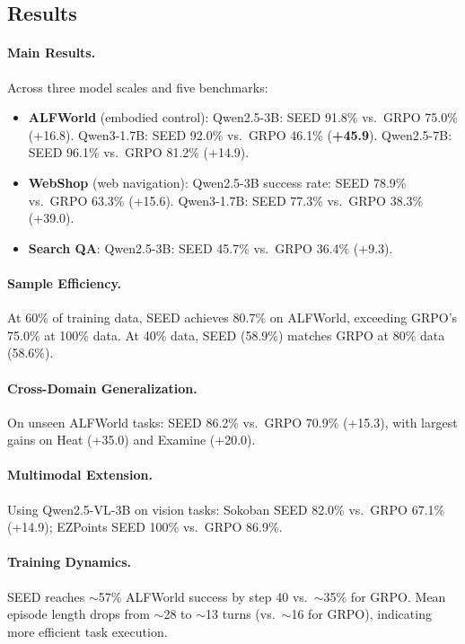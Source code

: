 \documentclass[11pt,a4paper]{article}
\begin{document}
\subsection{Results}

\paragraph{Main Results.} Across three model scales and five benchmarks:
\begin{itemize}
\item \textbf{ALFWorld} (embodied control): Qwen2.5-3B: SEED 91.8\% vs.\ GRPO 75.0\% (+16.8). Qwen3-1.7B: SEED 92.0\% vs.\ GRPO 46.1\% (\textbf{+45.9}). Qwen2.5-7B: SEED 96.1\% vs.\ GRPO 81.2\% (+14.9).
\item \textbf{WebShop} (web navigation): Qwen2.5-3B success rate: SEED 78.9\% vs.\ GRPO 63.3\% (+15.6). Qwen3-1.7B: SEED 77.3\% vs.\ GRPO 38.3\% (+39.0).
\item \textbf{Search QA}: Qwen2.5-3B: SEED 45.7\% vs.\ GRPO 36.4\% (+9.3).
\end{itemize}

\paragraph{Sample Efficiency.} At 60\% of training data, SEED achieves 80.7\% on ALFWorld, exceeding GRPO's 75.0\% at 100\% data. At 40\% data, SEED (58.9\%) matches GRPO at 80\% data (58.6\%).

\paragraph{Cross-Domain Generalization.} On unseen ALFWorld tasks: SEED 86.2\% vs.\ GRPO 70.9\% (+15.3), with largest gains on Heat (+35.0) and Examine (+20.0).

\paragraph{Multimodal Extension.} Using Qwen2.5-VL-3B on vision tasks: Sokoban SEED 82.0\% vs.\ GRPO 67.1\% (+14.9); EZPoints SEED 100\% vs.\ GRPO 86.9\%.

\paragraph{Training Dynamics.} SEED reaches ${\sim}$57\% ALFWorld success by step 40 vs.\ ${\sim}$35\% for GRPO. Mean episode length drops from ${\sim}$28 to ${\sim}$13 turns (vs.\ ${\sim}$16 for GRPO), indicating more efficient task execution.
\end{document}
